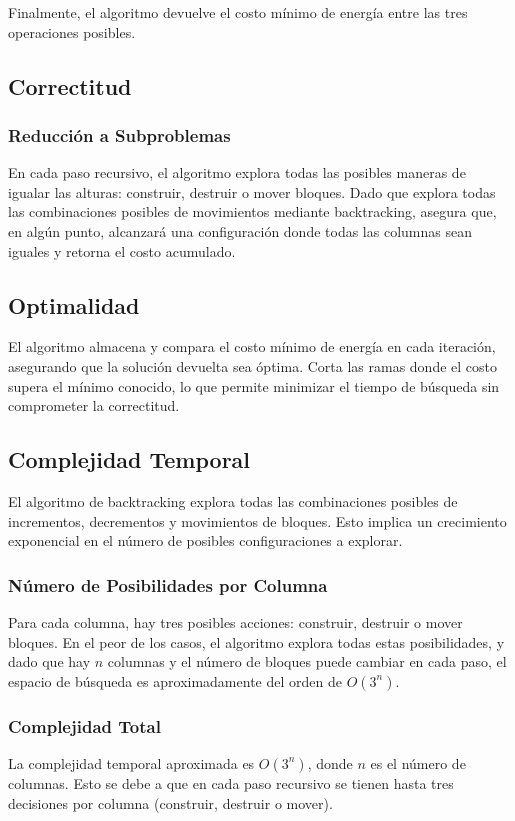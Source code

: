 \documentclass[a4paper,12pt]{article}
\begin{document}
Finalmente, el algoritmo devuelve el costo mínimo de energía entre las tres operaciones posibles.

\subsection{Correctitud}
\subsubsection{Reducción a Subproblemas}
En cada paso recursivo, el algoritmo explora todas las posibles maneras de igualar las alturas: construir, destruir o mover bloques. Dado que explora todas las combinaciones posibles de movimientos mediante backtracking, asegura que, en algún punto, alcanzará una configuración donde todas las columnas sean iguales y retorna el costo acumulado.

\subsection{Optimalidad}

El algoritmo almacena y compara el costo mínimo de energía en cada iteración, asegurando que la solución devuelta sea óptima. Corta las ramas donde el costo supera el mínimo conocido, lo que permite minimizar el tiempo de búsqueda sin comprometer la correctitud.

\subsection{Complejidad Temporal}
El algoritmo de backtracking explora todas las combinaciones posibles de incrementos, decrementos y movimientos de bloques. Esto implica un crecimiento exponencial en el número de posibles configuraciones a explorar.

\subsubsection{Número de Posibilidades por Columna}
Para cada columna, hay tres posibles acciones: construir, destruir o mover bloques. En el peor de los casos, el algoritmo explora todas estas posibilidades, y dado que hay \( n \) columnas y el número de bloques puede cambiar en cada paso, el espacio de búsqueda es aproximadamente del orden de \( O(3^n) \).

\subsubsection{Complejidad Total}
La complejidad temporal aproximada es \( O(3^n) \), donde \( n \) es el número de columnas. Esto se debe a que en cada paso recursivo se tienen hasta tres decisiones por columna (construir, destruir o mover).
\end{document}
